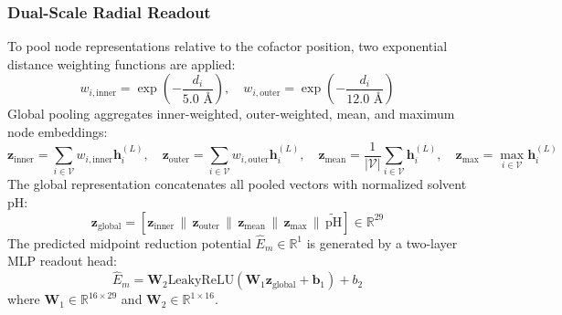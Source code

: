 \documentclass[journal=jcisd8,manuscript=article]{achemso}
\begin{document}
\subsubsection{Dual-Scale Radial Readout}
To pool node representations relative to the cofactor position, two exponential distance weighting functions are applied:
\begin{equation}
w_{i,\text{inner}} = \exp\left(-\frac{d_i}{5.0\text{ \AA}}\right), \quad w_{i,\text{outer}} = \exp\left(-\frac{d_i}{12.0\text{ \AA}}\right)
\end{equation}
Global pooling aggregates inner-weighted, outer-weighted, mean, and maximum node embeddings:
\begin{equation}
\mathbf{z}_{\text{inner}} = \sum_{i \in \mathcal{V}} w_{i,\text{inner}} \mathbf{h}_i^{(L)}, \quad \mathbf{z}_{\text{outer}} = \sum_{i \in \mathcal{V}} w_{i,\text{outer}} \mathbf{h}_i^{(L)}, \quad \mathbf{z}_{\text{mean}} = \frac{1}{|\mathcal{V}|} \sum_{i \in \mathcal{V}} \mathbf{h}_i^{(L)}, \quad \mathbf{z}_{\text{max}} = \max_{i \in \mathcal{V}} \mathbf{h}_i^{(L)}
\end{equation}
The global representation concatenates all pooled vectors with normalized solvent pH:
\begin{equation}
\mathbf{z}_{\text{global}} = [\mathbf{z}_{\text{inner}} \,\|\, \mathbf{z}_{\text{outer}} \,\|\, \mathbf{z}_{\text{mean}} \,\|\, \mathbf{z}_{\text{max}} \,\|\, \widetilde{\text{pH}}] \in \mathbb{R}^{29}
\end{equation}
The predicted midpoint reduction potential $\widehat{E}_m \in \mathbb{R}^1$ is generated by a two-layer MLP readout head:
\begin{equation}
\widehat{E}_m = \mathbf{W}_2 \text{LeakyReLU}\left(\mathbf{W}_1 \mathbf{z}_{\text{global}} + \mathbf{b}_1\right) + b_2
\end{equation}
where $\mathbf{W}_1 \in \mathbb{R}^{16 \times 29}$ and $\mathbf{W}_2 \in \mathbb{R}^{1 \times 16}$.
\end{document}
